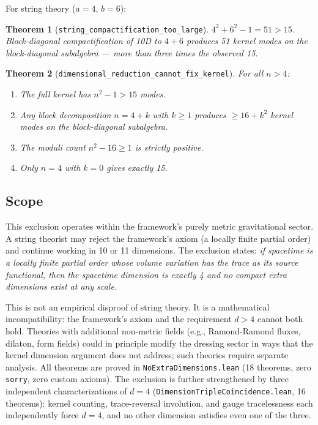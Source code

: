 \documentclass[11pt,letterpaper]{article}
\newtheorem{theorem}{Theorem}
\begin{document}
For string theory ($a = 4$, $b = 6$):

\begin{theorem}[\texttt{string\_compactification\_too\_large}]
$4^2 + 6^2 - 1 = 51 > 15$.  Block-diagonal compactification of
10D to $4 + 6$ produces 51 kernel modes on the block-diagonal
subalgebra --- more than three times the observed 15.
\end{theorem}

\begin{theorem}[\texttt{dimensional\_reduction\_cannot\_fix\_kernel}]
\label{thm:noreduction}
For all $n > 4$:
\begin{enumerate}[nosep,label=(\alph*)]
  \item The full kernel has $n^2 - 1 > 15$ modes.
  \item Any block decomposition $n = 4 + k$ with $k \geq 1$
    produces $\geq 16 + k^2$ kernel modes on the block-diagonal
    subalgebra.
  \item The moduli count $n^2 - 16 \geq 1$ is strictly positive.
  \item Only $n = 4$ with $k = 0$ gives exactly 15.
\end{enumerate}
\end{theorem}

\subsection{Scope}

This exclusion operates within the framework's purely metric
gravitational sector.  A string theorist
may reject the framework's axiom (a locally finite partial order)
and continue working in 10 or 11 dimensions.  The exclusion
states: \emph{if spacetime is a locally finite partial order
whose volume variation has the trace as its source functional,
then the spacetime dimension is exactly 4 and no compact extra
dimensions exist at any scale.}

This is not an empirical disproof of string theory.  It is a
mathematical incompatibility: the framework's axiom and the
requirement $d > 4$ cannot both hold.  Theories with additional
non-metric fields (e.g., Ramond-Ramond fluxes, dilaton, form
fields) could in principle modify the dressing sector in ways
that the kernel dimension argument does not address; such
theories require separate analysis.  All theorems are proved
in \texttt{NoExtraDimensions.lean} (18 theorems, zero
\texttt{sorry}, zero custom axioms).  The exclusion is further
strengthened by three independent characterizations of $d = 4$
(\texttt{DimensionTripleCoincidence.lean}, 16 theorems): kernel
counting, trace-reversal involution, and gauge tracelessness each
independently force $d = 4$, and no other dimension satisfies even
one of the three.
\end{document}
